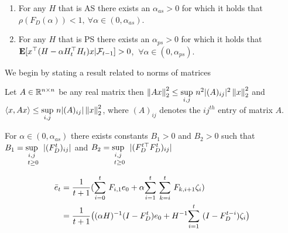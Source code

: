 \begin{lemma}\label{addstep}
\begin{enumerate}[label=(\roman*)]
\item For any $H$ that is AS there exists an $\alpha_{as}>0$ for which it holds that $\rho(F_D(\alpha))<1,~\forall \alpha\in (0,\alpha_{as})$.
\item For any $H$ that is PS there exists an $\alpha_{ps}>0$ for which it holds that $\E[x^\top(H-\alpha H_t^\top H_t)x|\F_{t-1}]> 0$, $~\forall \alpha\in (0,\alpha_{ps})$.
\end{enumerate}
\end{lemma}
We begin by stating a result related to norms of matrices
\begin{lemma}
Let $A\in \R^{n\times n}$ be any real matrix then $\norm{Ax}^2_2\leq \us{\sup}{i,j}n^2|(A)_{ij}|^2\norm{x}^2_2$ and $\ip{x,Ax}\leq \us{\sup}{i,j}n|(A)_{ij}|\norm{x}^2_2$, where $(A)_{ij}$ denotes the $ij^{th}$ entry of matrix $A$.
\end{lemma}
\begin{lemma}
For $\alpha \in (0,\alpha_{as})$ there exists constants $B_1>0$ and $B_2>0$ such that $B_1=\us{\us{\sup}{i,j}}{t\geq 0}|(F_D^t)_{ij}|$ and $B_2=\us{\us{\sup}{i,j}}{t\geq 0}|(F_D^{t\top}F_D^t)_{ij}|$
\end{lemma}
\begin{align}
\eb_t&=\frac{1}{t+1}(\ous{\sum}{i=0}{t} F_{i,1} e_0+ \alpha\ous{\sum}{i=1}{t} \ous{\sum}{k=i}{t} F_{k,i+1}  \zeta_i )\nn\\
&=\frac{1}{t+1}\big((\alpha H)^{-1}(I-F_D^t)e_0+ H^{-1}\ous{\sum}{i=1}{t}(I-F_D^{t-i}) \zeta_i\big)
\end{align}
